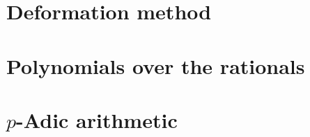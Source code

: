 
\chapter{Deformation method}


\chapter{Polynomials over the rationals}


\chapter{$p$-Adic arithmetic}



